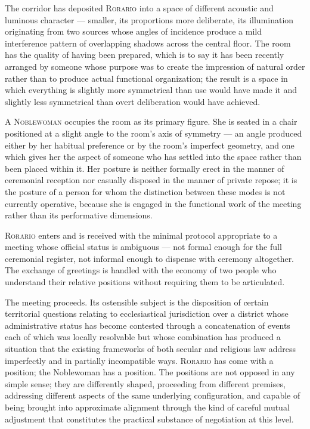\documentclass[12pt, oneside]{article}
\newenvironment{action}{%
  \vspace{0.6em}%
  \noindent\ignorespaces%
}{%
  \par\vspace{0.6em}%
}
\begin{document}
\begin{action}
The corridor has deposited \textsc{Rorario} into a space of different acoustic and luminous character --- smaller, its proportions more deliberate, its illumination originating from two sources whose angles of incidence produce a mild interference pattern of overlapping shadows across the central floor. The room has the quality of having been prepared, which is to say it has been recently arranged by someone whose purpose was to create the impression of natural order rather than to produce actual functional organization; the result is a space in which everything is slightly more symmetrical than use would have made it and slightly less symmetrical than overt deliberation would have achieved.

A \textsc{Noblewoman} occupies the room as its primary figure. She is seated in a chair positioned at a slight angle to the room's axis of symmetry --- an angle produced either by her habitual preference or by the room's imperfect geometry, and one which gives her the aspect of someone who has settled into the space rather than been placed within it. Her posture is neither formally erect in the manner of ceremonial reception nor casually disposed in the manner of private repose; it is the posture of a person for whom the distinction between these modes is not currently operative, because she is engaged in the functional work of the meeting rather than its performative dimensions.
\end{action}

\begin{action}
\textsc{Rorario} enters and is received with the minimal protocol appropriate to a meeting whose official status is ambiguous --- not formal enough for the full ceremonial register, not informal enough to dispense with ceremony altogether. The exchange of greetings is handled with the economy of two people who understand their relative positions without requiring them to be articulated.

The meeting proceeds. Its ostensible subject is the disposition of certain territorial questions relating to ecclesiastical jurisdiction over a district whose administrative status has become contested through a concatenation of events each of which was locally resolvable but whose combination has produced a situation that the existing frameworks of both secular and religious law address imperfectly and in partially incompatible ways. \textsc{Rorario} has come with a position; the Noblewoman has a position. The positions are not opposed in any simple sense; they are differently shaped, proceeding from different premises, addressing different aspects of the same underlying configuration, and capable of being brought into approximate alignment through the kind of careful mutual adjustment that constitutes the practical substance of negotiation at this level.
\end{action}
\end{document}
